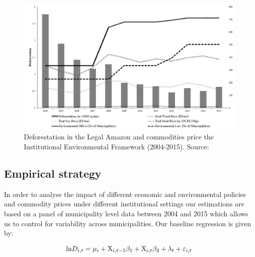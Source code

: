 \begin{figure}[H]
  \centering
  \includegraphics[width=1\textwidth, inner]{Figure1_price.png}
\caption{Deforestation in the Legal Amazon and commodities price the Institutional Environmental Framework (2004-2015). Source: \citep{inpe, IBGE1,CEPEA}}
\label{fig:3}
\end{figure}


\subsection{Empirical strategy}

In order to analyse the impact of different economic and environmental policies and commodity prices under different institutional settings our estimations are based on a panel of municipality level data between 2004 and 2015 which allows us to control for variability across municipalities.  Our baseline regression is given by:

\begin{equation}
    \text{ln}D_{i,t} = \mu_{i} + \text{X}_{i,t-1}\beta_{1}  + \text{X}_{i,t} \beta_{2} + \lambda_{t} + \varepsilon_{i,t} \label{eq:1} \\\\
\end{equation}


